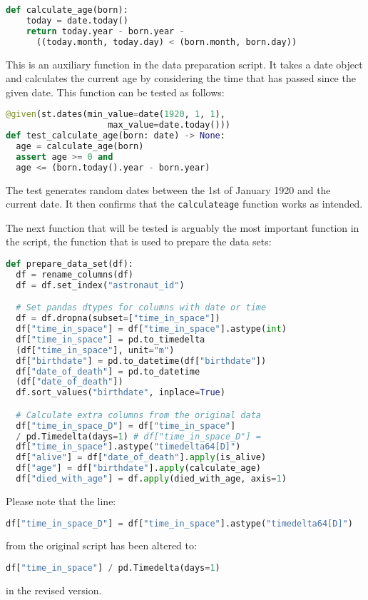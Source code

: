 \documentclass[runningheads]{llncs}
\begin{document}
\begin{lstlisting}[language=Python]
  def calculate_age(born):
    today = date.today()
    return today.year - born.year - 
      ((today.month, today.day) < (born.month, born.day))
\end{lstlisting}
This is an auxiliary function in the data preparation script. It takes a date object and calculates the current age by considering the time that has passed since the given date. This function can be tested as follows:

\begin{lstlisting}[language=Python]
@given(st.dates(min_value=date(1920, 1, 1), 
                    max_value=date.today()))
def test_calculate_age(born: date) -> None:
  age = calculate_age(born)
  assert age >= 0 and 
  age <= (born.today().year - born.year)
\end{lstlisting}
The test generates random dates between the 1st of January 1920 and the current date. It then confirms that the \texttt{calculateage} function works as intended.

\vspace{5mm}
\noindent The next function that will be tested is arguably the most important function in the script, the function that is used to prepare the data sets:

\begin{lstlisting}[language=Python]
def prepare_data_set(df):
  df = rename_columns(df)
  df = df.set_index("astronaut_id")

  # Set pandas dtypes for columns with date or time
  df = df.dropna(subset=["time_in_space"])
  df["time_in_space"] = df["time_in_space"].astype(int)
  df["time_in_space"] = pd.to_timedelta
  (df["time_in_space"], unit="m")
  df["birthdate"] = pd.to_datetime(df["birthdate"])
  df["date_of_death"] = pd.to_datetime
  (df["date_of_death"])
  df.sort_values("birthdate", inplace=True)

  # Calculate extra columns from the original data
  df["time_in_space_D"] = df["time_in_space"] 
  / pd.Timedelta(days=1) # df["time_in_space_D"] = 
  df["time_in_space"].astype("timedelta64[D]")
  df["alive"] = df["date_of_death"].apply(is_alive)
  df["age"] = df["birthdate"].apply(calculate_age)
  df["died_with_age"] = df.apply(died_with_age, axis=1)
\end{lstlisting}

\vspace{5mm}
\noindent Please note that the line:
\begin{lstlisting}[language=Python]
  df["time_in_space_D"] = df["time_in_space"].astype("timedelta64[D]")
\end{lstlisting}
from the original script has been altered to:
\begin{lstlisting}[language=Python]
  df["time_in_space"] / pd.Timedelta(days=1)
\end{lstlisting}
in the revised version.
\vspace{5mm}
\end{document}
